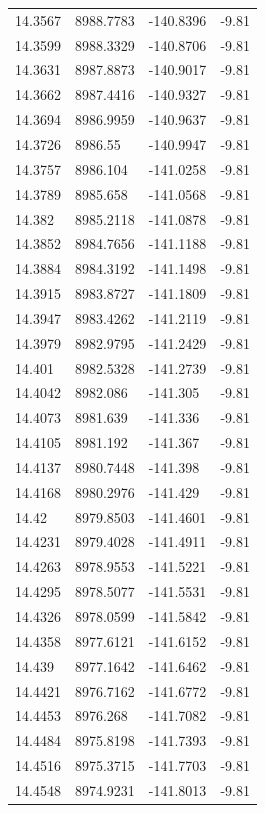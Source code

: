\begin{table}[H]
\begin{tabular}{llll}
14.3567 & 8988.7783 & -140.8396 & -9.81 \\
14.3599 & 8988.3329 & -140.8706 & -9.81 \\
14.3631 & 8987.8873 & -140.9017 & -9.81 \\
14.3662 & 8987.4416 & -140.9327 & -9.81 \\
14.3694 & 8986.9959 & -140.9637 & -9.81 \\
14.3726 & 8986.55 & -140.9947 & -9.81 \\
14.3757 & 8986.104 & -141.0258 & -9.81 \\
14.3789 & 8985.658 & -141.0568 & -9.81 \\
14.382 & 8985.2118 & -141.0878 & -9.81 \\
14.3852 & 8984.7656 & -141.1188 & -9.81 \\
14.3884 & 8984.3192 & -141.1498 & -9.81 \\
14.3915 & 8983.8727 & -141.1809 & -9.81 \\
14.3947 & 8983.4262 & -141.2119 & -9.81 \\
14.3979 & 8982.9795 & -141.2429 & -9.81 \\
14.401 & 8982.5328 & -141.2739 & -9.81 \\
14.4042 & 8982.086 & -141.305 & -9.81 \\
14.4073 & 8981.639 & -141.336 & -9.81 \\
14.4105 & 8981.192 & -141.367 & -9.81 \\
14.4137 & 8980.7448 & -141.398 & -9.81 \\
14.4168 & 8980.2976 & -141.429 & -9.81 \\
14.42 & 8979.8503 & -141.4601 & -9.81 \\
14.4231 & 8979.4028 & -141.4911 & -9.81 \\
14.4263 & 8978.9553 & -141.5221 & -9.81 \\
14.4295 & 8978.5077 & -141.5531 & -9.81 \\
14.4326 & 8978.0599 & -141.5842 & -9.81 \\
14.4358 & 8977.6121 & -141.6152 & -9.81 \\
14.439 & 8977.1642 & -141.6462 & -9.81 \\
14.4421 & 8976.7162 & -141.6772 & -9.81 \\
14.4453 & 8976.268 & -141.7082 & -9.81 \\
14.4484 & 8975.8198 & -141.7393 & -9.81 \\
14.4516 & 8975.3715 & -141.7703 & -9.81 \\
14.4548 & 8974.9231 & -141.8013 & -9.81 \\

\end{tabular}
\end{table}
